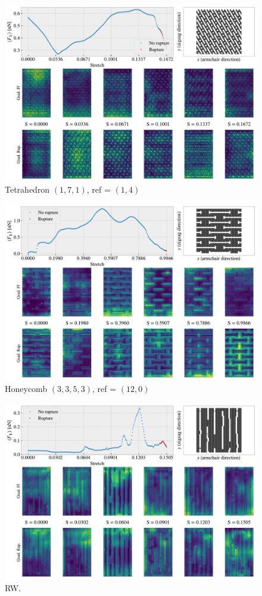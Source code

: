 \begin{figure}[H]
  \centering
  \includegraphics[width=0.8\linewidth]{figures/search/grad_cam_pop_1_7_1_1_4.pdf}
  \caption{Tetrahedron $(1,7,1)$, ref = $(1,4)$}
  \label{fig:GC_pop_search}
\end{figure}  


\begin{figure}[H]
  \centering
  \includegraphics[width=0.8\linewidth]{figures/search/grad_cam_hon_3_3_5_3_12_0.pdf}
  \caption{Honeycomb $(3,3,5,3)$, ref = $(12,0)$}
  \label{fig:GC_hon_search}
\end{figure}  

\begin{figure}[H]
  \centering
  \includegraphics[width=0.8\linewidth]{figures/search/grad_cam_RW_search_max_drop0.pdf}
  \caption{RW.}
  \label{fig:GC_RW_search}
\end{figure}  




